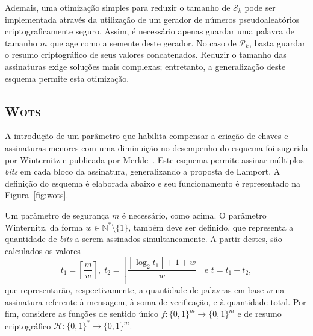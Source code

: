 \documentclass{ufsctex/ufsctex}
\newcommand{\hh}{\mathcal{H}}
\newcommand{\pk}{\mathcal{P}_{k}}
\newcommand{\sk}{\mathcal{S}_{k}}
\newcommand{\binwds}[1]{\{0, 1\}^{#1}}
\newcommand{\fhash}[1]{\hh{}: \binwds{*} \longrightarrow{} \binwds{#1}}
\newcommand{\wots}{\textsc{Wots}}
\begin{document}
Ademais, uma otimização simples para reduzir o tamanho de $\sk{}$ pode ser
implementada através da utilização de um gerador de números pseudoaleatórios
criptograficamente seguro. Assim, é necessário apenas guardar uma palavra de
tamanho $m$ que age como a semente deste gerador. No caso de $\pk{}$, basta
guardar o resumo criptográfico de seus valores concatenados. Reduzir o tamanho
das assinaturas exige soluções mais complexas; entretanto, a generalização
deste esquema permite esta otimização.

\subsection{\wots{}}\label{subsection:wots}

A introdução de um parâmetro que habilita compensar a criação de chaves e
assinaturas menores com uma diminuição no desempenho do esquema foi sugerida
por Winternitz e publicada por Merkle~\cite[Capítulo
5]{Merkle:inproc:1989:aug}. Este esquema permite assinar múltiplos \emph{bits}
em cada bloco da assinatura, generalizando a proposta de Lamport. A definição
do esquema é elaborada abaixo e seu funcionamento é representado na
Figura~\ref{fig:wots}.

Um parâmetro de segurança $m$ é necessário, como acima. O parâmetro Winternitz,
da forma $w \in \mathbb{N}^{*}\setminus\{1\}$, também deve ser definido, que
representa a quantidade de \emph{bits} a serem assinados simultaneamente. A
partir destes, são calculados os valores \[t_{1} = \left\lceil \frac{m}{w}
\right\rceil, \; t_{2} = \left\lceil \frac{\left\lfloor \log_2 t_{1}
\right\rfloor + 1 + w}{w} \right\rceil \text{ e } t = t_{1} + t_{2},\] que
representarão, respectivamente, a quantidade de palavras em base-$w$ na
assinatura referente à mensagem, à soma de verificação, e à quantidade total.
Por fim, considere as funções de sentido único $f : \binwds{m} \longrightarrow
\binwds{m}$ e de resumo criptográfico $\fhash{m}$.
\end{document}
